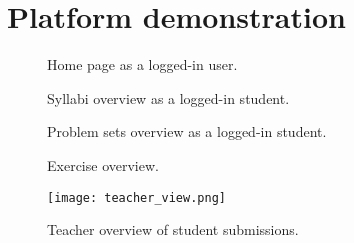 \chapter{Platform demonstration} \label{chap:images}
\begin{figure}[H]
    \centering
    \caption{Home page as a logged-in user.}
    \label{fig:Home page}
\end{figure}

\begin{figure}[H]
    \centering
    \caption{Syllabi overview as a logged-in student.}
    \label{fig:syllabi}
\end{figure}

\begin{figure}[H]
    \centering
    \caption{Problem sets overview as a logged-in student.}
    \label{fig:problemsets}
\end{figure}

\begin{figure}[H]
    \centering
    \caption{Exercise overview.}
    \label{fig:exercise_overview}
\end{figure}

\begin{figure}[H]
    \centering
    \texttt{[image: teacher\_view.png]}
    \caption{Teacher overview of student submissions.}
    \label{fig:teacher_overview.}
\end{figure}